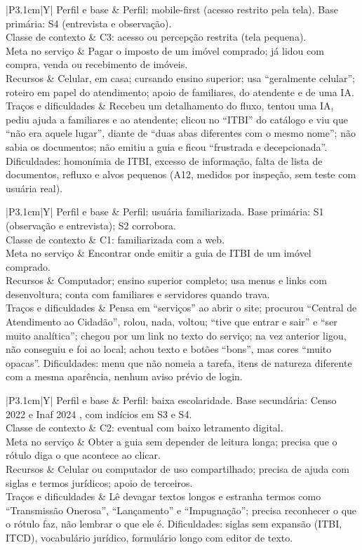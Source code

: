 \documentclass[
  12pt,
  oneside,
  a4paper,
  chapter=TITLE,
  section=TITLE,
  english,
  brazilian
]{abntex2}
\renewcommand{\fonte}[1]{\par\vspace{3pt}{\footnotesize\raggedright\noindent Fonte: #1\par}\vspace{4pt}}%
\newcommand{\persona}[7]{%
  \begin{quadro}[!htbp]
    \caption{Persona #1 --- #2}\label{qua:persona#1}
    \centering\small
    \begin{tabularx}{\textwidth}{|P{3.1cm}|Y|}\hline
      Perfil e base      & #3 \\\hline
      Classe de contexto & #4 \\\hline
      Meta no serviço    & #5 \\\hline
      Recursos           & #6 \\\hline
      Traços e dificuldades & #7 \\\hline
    \end{tabularx}
    \fonte{Elaborado pelos autores (2026).}
  \end{quadro}}
\begin{document}
\persona{2}{Júlia, 19 anos, usuária de celular}%
  {Perfil: mobile-first (acesso restrito pela tela). Base primária: S4 (entrevista e observação).}%
  {C3: acesso ou percepção restrita (tela pequena).}%
  {Pagar o imposto de um imóvel comprado; já lidou com compra, venda ou recebimento de imóveis.}%
  {Celular, em casa; cursando ensino superior; usa ``geralmente celular''; roteiro em papel do atendimento; apoio de familiares, do atendente e de uma IA.}%
  {Recebeu um detalhamento do fluxo, tentou uma IA, pediu ajuda a familiares e ao atendente; clicou no ``ITBI'' do catálogo e viu que ``não era aquele lugar'', diante de ``duas abas diferentes com o mesmo nome''; não sabia os documentos; não emitiu a guia e ficou ``frustrada e decepcionada''. Dificuldades: homonímia de ITBI, excesso de informação, falta de lista de documentos, refluxo e alvos pequenos (A12, medidos por inspeção, sem teste com usuária real).}

\persona{3}{Camila, familiarizada com a web}%
  {Perfil: usuária familiarizada. Base primária: S1 (observação e entrevista); S2 corrobora.}%
  {C1: familiarizada com a web.}%
  {Encontrar onde emitir a guia de ITBI de um imóvel comprado.}%
  {Computador; ensino superior completo; usa menus e links com desenvoltura; conta com familiares e servidores quando trava.}%
  {Pensa em ``serviços'' ao abrir o site; procurou ``Central de Atendimento ao Cidadão'', rolou, nada, voltou; ``tive que entrar e sair'' e ``ser muito analítica''; chegou por um link no texto do serviço; na vez anterior ligou, não conseguiu e foi ao local; achou texto e botões ``bons'', mas cores ``muito opacas''. Dificuldades: menu que não nomeia a tarefa, itens de natureza diferente com a mesma aparência, nenhum aviso prévio de login.}

\persona{4}{Rosimeire, baixa escolaridade}%
  {Perfil: baixa escolaridade. Base secundária: Censo 2022 \cite{ibgecenso2022} e Inaf 2024 \cite{inaf2024}, com indícios em S3 e S4.}%
  {C2: eventual com baixo letramento digital.}%
  {Obter a guia sem depender de leitura longa; precisa que o rótulo diga o que acontece ao clicar.}%
  {Celular ou computador de uso compartilhado; precisa de ajuda com siglas e termos jurídicos; apoio de terceiros.}%
  {Lê devagar textos longos e estranha termos como ``Transmissão Onerosa'', ``Lançamento'' e ``Impugnação''; precisa reconhecer o que o rótulo faz, não lembrar o que ele é. Dificuldades: siglas sem expansão (ITBI, ITCD), vocabulário jurídico, formulário longo com editor de texto.}
\end{document}
